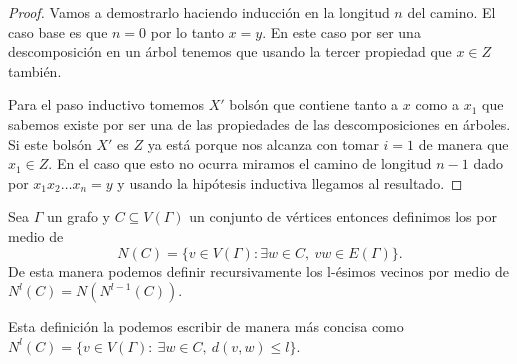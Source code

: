 \documentclass[tesis.tex]{subfiles}
\begin{document}
\begin{proof}	
	Vamos a demostrarlo haciendo inducción en la longitud $n$ del camino. 
	El caso base es que $n = 0$ por lo tanto $x=y$. 
	En este caso por ser una descomposición en un árbol tenemos que usando la tercer propiedad que $x \in Z$ también.
	
	Para el paso inductivo tomemos $X'$ bolsón que contiene tanto a $x$ como a $x_1$ que sabemos existe por ser una de las propiedades de las descomposiciones en árboles.
	Si este bolsón $X'$ es $Z$ ya está porque nos alcanza con tomar $i=1$ de manera que $x_1 \in Z$.
	En el caso que esto no ocurra miramos el camino de longitud $n-1$ dado por $x_1 x_2 \dots x_n = y$ y usando la hipótesis inductiva llegamos al resultado.	
\end{proof}


\begin{deff}
	Sea $\Gamma$ un grafo y $C \subseteq V(\Gamma)$ un conjunto de vértices entonces definimos los  por medio de 
	\[
	N(C) = \{ v \in V(\Gamma) : \exists w \in C, \ vw \in E(\Gamma) \}.
	\]
	De esta manera podemos definir recursivamente los l-ésimos vecinos por medio de $N^l(C) = N(N^{l-1}(C))$.
\end{deff}

\begin{obs}
	Esta definición la podemos escribir de manera más concisa como $N^l (C) = \{ v \in V(\Gamma) : \ \exists w \in C, \  d(v,w) \le l  \}$.
\end{obs}
\end{document}
